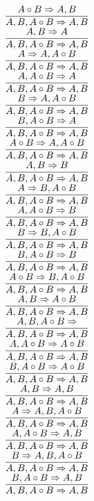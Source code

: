 \documentclass[11pt]{article}
\begin{document}
\begin{center}
\bigskip
\\$\infer{A, B, A\circ B\Rightarrow A, B}{A\circ B\Rightarrow A, B}$
\bigskip
\\$\infer{A, B, A\circ B\Rightarrow A, B}{A, B\Rightarrow A}$
\bigskip
\\$\infer{A, B, A\circ B\Rightarrow A, B}{A\Rightarrow A, A\circ B}$
\bigskip
\\$\infer{A, B, A\circ B\Rightarrow A, B}{A, A\circ B\Rightarrow A}$
\bigskip
\\$\infer{A, B, A\circ B\Rightarrow A, B}{B\Rightarrow A, A\circ B}$
\bigskip
\\$\infer{A, B, A\circ B\Rightarrow A, B}{B, A\circ B\Rightarrow A}$
\bigskip
\\$\infer{A, B, A\circ B\Rightarrow A, B}{A\circ B\Rightarrow A, A\circ B}$
\bigskip
\\$\infer{A, B, A\circ B\Rightarrow A, B}{A, B\Rightarrow B}$
\bigskip
\\$\infer{A, B, A\circ B\Rightarrow A, B}{A\Rightarrow B, A\circ B}$
\bigskip
\\$\infer{A, B, A\circ B\Rightarrow A, B}{A, A\circ B\Rightarrow B}$
\bigskip
\\$\infer{A, B, A\circ B\Rightarrow A, B}{B\Rightarrow B, A\circ B}$
\bigskip
\\$\infer{A, B, A\circ B\Rightarrow A, B}{B, A\circ B\Rightarrow B}$
\bigskip
\\$\infer{A, B, A\circ B\Rightarrow A, B}{A\circ B\Rightarrow B, A\circ B}$
\bigskip
\\$\infer{A, B, A\circ B\Rightarrow A, B}{A, B\Rightarrow A\circ B}$
\bigskip
\\$\infer{A, B, A\circ B\Rightarrow A, B}{A, B, A\circ B\Rightarrow }$
\bigskip
\\$\infer{A, B, A\circ B\Rightarrow A, B}{A, A\circ B\Rightarrow A\circ B}$
\bigskip
\\$\infer{A, B, A\circ B\Rightarrow A, B}{B, A\circ B\Rightarrow A\circ B}$
\bigskip
\\$\infer{A, B, A\circ B\Rightarrow A, B}{A, B\Rightarrow A, B}$
\bigskip
\\$\infer{A, B, A\circ B\Rightarrow A, B}{A\Rightarrow A, B, A\circ B}$
\bigskip
\\$\infer{A, B, A\circ B\Rightarrow A, B}{A, A\circ B\Rightarrow A, B}$
\bigskip
\\$\infer{A, B, A\circ B\Rightarrow A, B}{B\Rightarrow A, B, A\circ B}$
\bigskip
\\$\infer{A, B, A\circ B\Rightarrow A, B}{B, A\circ B\Rightarrow A, B}$

\end{center}
\end{document}
